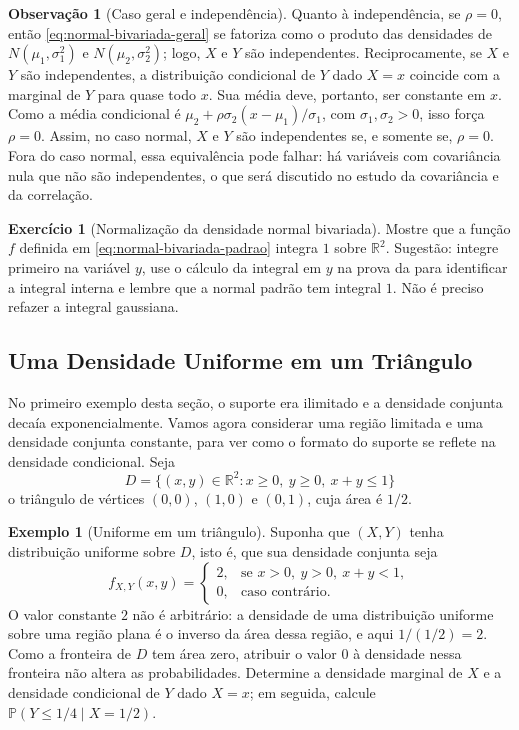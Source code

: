 \documentclass[12pt,portuguese]{article}
\theoremstyle{definition}
\newtheorem{example}[example]{Exemplo}
\newtheorem{remark}[remark]{Observação}
\theoremstyle{plainexercise}
\newtheorem{exercise}{Exercício}
\theoremstyle{starredexercise}
\theoremstyle{definition}
\begin{document}
\begin{remark}[Caso geral e independência]
Quanto à independência, se $\rho = 0$, então \eqref{eq:normal-bivariada-geral} se fatoriza
como o produto das densidades de $N(\mu_1,\sigma_1^2)$ e $N(\mu_2,\sigma_2^2)$;
logo, $X$ e $Y$ são independentes. Reciprocamente, se $X$ e $Y$ são independentes,
a distribuição condicional de $Y$ dado $X=x$ coincide com a marginal de $Y$
para quase todo $x$. Sua média deve, portanto, ser constante em $x$.
Como a média condicional é $\mu_2+\rho\sigma_2(x-\mu_1)/\sigma_1$,
com $\sigma_1,\sigma_2>0$, isso força $\rho=0$. Assim, no caso
normal, $X$ e $Y$ são independentes se, e somente se, $\rho = 0$. Fora do caso normal, essa
equivalência pode falhar: há variáveis com covariância nula que não são independentes, o que
será discutido no estudo da covariância e da correlação.
\end{remark}

\begin{exercise}[Normalização da densidade normal bivariada]
\label{exercise:normalizacao-bivariada}
Mostre que a função $f$ definida em \eqref{eq:normal-bivariada-padrao} integra $1$ sobre
$\mathbb{R}^2$. Sugestão: integre primeiro na variável $y$, use
o cálculo da integral em $y$ na prova da 
para identificar a integral interna e lembre que a normal
padrão tem integral $1$. Não é preciso refazer a integral gaussiana.
\end{exercise}

\subsection{Uma Densidade Uniforme em um Triângulo}\label{subsec:uniforme-triangulo}

No primeiro exemplo desta seção, o suporte era ilimitado e a densidade conjunta decaía
exponencialmente. Vamos agora considerar uma região limitada e uma densidade conjunta
constante, para ver como o formato do suporte se reflete na densidade condicional. Seja
\[
  D = \bigl\{(x,y) \in \mathbb{R}^2 : x \geqslant 0,\ y \geqslant 0,\ x+y \leqslant 1\bigr\}
\]
o triângulo de vértices $(0,0)$, $(1,0)$ e $(0,1)$, cuja área é $1/2$.

\begin{example}[Uniforme em um triângulo]\label{ex:uniforme-triangulo}
Suponha que $(X,Y)$ tenha distribuição uniforme sobre $D$, isto é, que sua densidade
conjunta seja
\begin{equation}\label{eq:uniforme-triangulo-conjunta}
  f_{X,Y}(x,y) =
  \begin{cases}
    2, & \text{se } x>0,\ y>0,\ x+y<1, \\
    0, & \text{caso contrário}.
  \end{cases}
\end{equation}
O valor constante $2$ não é arbitrário: a densidade de uma distribuição uniforme sobre uma
região plana é o inverso da área dessa região, e aqui $1/(1/2) = 2$.
Como a fronteira de $D$ tem área zero, atribuir o valor $0$ à densidade
nessa fronteira não altera as probabilidades. Determine a densidade
marginal de $X$ e a densidade condicional de $Y$ dado $X = x$; em seguida, calcule
$\mathbb{P}(Y \leqslant 1/4 \mid X = 1/2)$.
\end{example}
\end{document}
